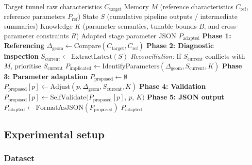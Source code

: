 \documentclass[a4paper,fleqn]{cas-dc}
\begin{document}
{\begin{algorithm}[ht]
\caption{LLM-driven Parameter Adaptation via CoT}\label{alg:cot_adaptation}
\begin{algorithmic}[1]
\Require Target tunnel raw characteristics $C_{\text{target}}$
\Require Memory $M$ (reference characteristics $C_{\text{ref}}$, reference parameters $P_{\text{ref}}$)
\Require State $S$ (cumulative pipeline outputs / intermediate summaries)
\Require Knowledge $K$ (parameter semantics, tunable bounds $B$, and cross-parameter constraints $R$)
\Ensure Adapted stage parameter JSON $P_{\text{adapted}}$
\State \textbf{Phase 1: Referencing}
\State $\Delta_{\text{geom}} \gets \text{Compare}(C_{\text{target}}, C_{\text{ref}})$ 
\State \textbf{Phase 2: Diagnostic inspection}
\State $S_{\text{current}} \gets \text{ExtractLatest}(S)$ 
\State \textit{Reconciliation:} If $S_{\text{current}}$ conflicts with $M$, prioritise $S_{\text{current}}$
\State $P_{\text{implicated}} \gets \text{IdentifyParameters}(\Delta_{\text{geom}}, S_{\text{current}}, K)$ 
\State \textbf{Phase 3: Parameter adaptation}
\State $P_{\text{proposed}} \gets \emptyset$
    \State $P_{\text{proposed}}[p] \gets \text{Adjust}(p, \Delta_{\text{geom}}, S_{\text{current}}, K)$ 
\EndFor
\State \textbf{Phase 4: Validation}
    \State $P_{\text{proposed}}[p] \gets \text{SelfValidate}\big(P_{\text{proposed}}[p],\, p,\, K\big)$
\EndFor
\State \textbf{Phase 5: JSON output}
\State $P_{\text{adapted}} \gets \text{FormatAsJSON}(P_{\text{proposed}})$
\State \Return $P_{\text{adapted}}$
\end{algorithmic}
\end{algorithm}


\subsection{Experimental setup}\label{sec:exp-setup}

\subsubsection{Dataset}\label{sec:dataset}

}
\end{document}
